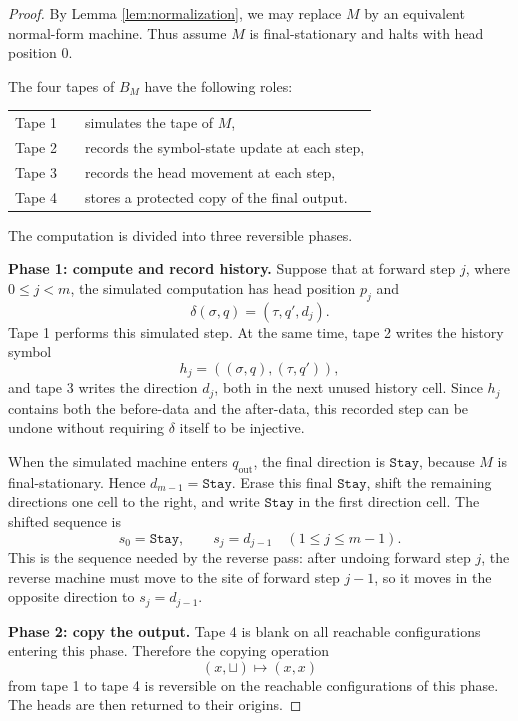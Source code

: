\documentclass[12pt]{article}
\theoremstyle{plain}
\theoremstyle{definition}
\newcommand{\blank}{\sqcup}
\begin{document}
\begin{proof}
By Lemma \ref{lem:normalization}, we may replace $M$ by an equivalent normal-form machine. Thus assume $M$ is final-stationary and halts with head position $0$.

The four tapes of $B_M$ have the following roles:
\begin{center}
\begin{tabular}{ccl}
\toprule
Tape 1 && simulates the tape of $M$,\\
Tape 2 && records the symbol-state update at each step,\\
Tape 3 && records the head movement at each step,\\
Tape 4 && stores a protected copy of the final output.\\
\bottomrule
\end{tabular}
\end{center}

The computation is divided into three reversible phases.

\medskip
\noindent\textbf{Phase 1: compute and record history.}
Suppose that at forward step $j$, where $0\leq j<m$, the simulated computation has head position $p_j$ and
\[
\delta(\sigma,q)=(\tau,q',d_j).
\]
Tape 1 performs this simulated step. At the same time, tape 2 writes the history symbol
\[
h_j=((\sigma,q),(\tau,q')),
\]
and tape 3 writes the direction $d_j$, both in the next unused history cell. Since $h_j$ contains both the before-data and the after-data, this recorded step can be undone without requiring $\delta$ itself to be injective.

When the simulated machine enters $q_{\mathrm{out}}$, the final direction is $\texttt{Stay}$, because $M$ is final-stationary. Hence $d_{m-1}=\texttt{Stay}$. Erase this final $\texttt{Stay}$, shift the remaining directions one cell to the right, and write $\texttt{Stay}$ in the first direction cell. The shifted sequence is
\[
s_0=\texttt{Stay},
\qquad
s_j=d_{j-1}\quad(1\leq j\leq m-1).
\]
This is the sequence needed by the reverse pass: after undoing forward step $j$, the reverse machine must move to the site of forward step $j-1$, so it moves in the opposite direction to $s_j=d_{j-1}$.

\medskip
\noindent\textbf{Phase 2: copy the output.}
Tape 4 is blank on all reachable configurations entering this phase. Therefore the copying operation
\[
(x,\blank)\longmapsto(x,x)
\]
from tape 1 to tape 4 is reversible on the reachable configurations of this phase. The heads are then returned to their origins.


\end{proof}
\end{document}

